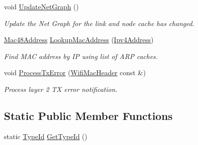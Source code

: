 \begin{DoxyCompactItemize}
void \hyperlink{classns3_1_1dsr_1_1DsrRouteCache_afab8a17441a368141d8b766e296c7165}{Update\+Net\+Graph} ()
\begin{DoxyCompactList}\small\item\em Update the Net Graph for the link and node cache has changed. \end{DoxyCompactList}\item 
\hyperlink{classns3_1_1Mac48Address}{Mac48\+Address} \hyperlink{classns3_1_1dsr_1_1DsrRouteCache_a37fef2c4a1dab164dca35aafd3ceff7b}{Lookup\+Mac\+Address} (\hyperlink{classns3_1_1Ipv4Address}{Ipv4\+Address})
\begin{DoxyCompactList}\small\item\em Find M\+AC address by IP using list of A\+RP caches. \end{DoxyCompactList}\item 
void \hyperlink{classns3_1_1dsr_1_1DsrRouteCache_a132956e044267e07f4d7265e1541d83c}{Process\+Tx\+Error} (\hyperlink{classns3_1_1WifiMacHeader}{Wifi\+Mac\+Header} const \&)
\begin{DoxyCompactList}\small\item\em Process layer 2 TX error notification. \end{DoxyCompactList}\end{DoxyCompactItemize}
\subsection*{Static Public Member Functions}
\begin{DoxyCompactItemize}
\item 
static \hyperlink{classns3_1_1TypeId}{Type\+Id} \hyperlink{classns3_1_1dsr_1_1DsrRouteCache_a05b0ddede171b486247c73d1a3e52c48}{Get\+Type\+Id} ()
\end{DoxyCompactItemize}
